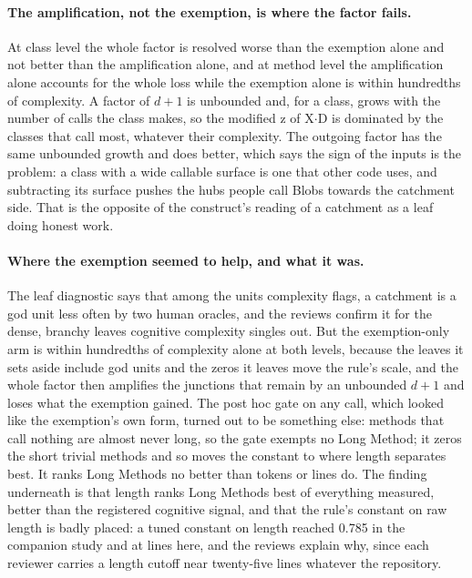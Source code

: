 \documentclass[11pt,a4paper]{article}
\begin{document}
\paragraph{The amplification, not the exemption, is where the factor
fails.} At class level the whole
factor is resolved worse than the exemption alone and not better than the
amplification alone, and at method level the amplification alone accounts
for the whole loss while the exemption alone is within hundredths of
complexity. A factor of $d + 1$ is
unbounded and, for a class, grows with the number of calls the class makes,
so the modified z of X$\cdot$D is dominated by the classes that call most,
whatever their complexity. The outgoing factor has the same unbounded
growth and does better, which says the sign of the inputs is the problem:
a class with a wide callable surface is one that other code uses, and
subtracting its surface pushes the hubs people call Blobs towards the
catchment side. That is the opposite of the construct's reading of a
catchment as a leaf doing honest work.

\paragraph{Where the exemption seemed to help, and what it was.} The leaf
diagnostic says that among the units complexity flags, a catchment is a god
unit less often by two human oracles, and the reviews confirm it for the
dense, branchy leaves cognitive complexity singles out. But the
exemption-only arm is within hundredths of complexity alone at both levels,
because the leaves it sets aside include god units and the zeros it leaves
move the rule's scale, and the whole factor then amplifies the junctions
that remain by an unbounded $d + 1$ and loses what the exemption gained.
The post hoc gate on any call, which looked like the exemption's own form,
turned out to be something else: methods that call nothing are almost never
long, so the gate exempts no Long Method; it zeros the short trivial
methods and so moves the constant to where length separates best. It ranks
Long Methods no better than tokens or lines do. The finding underneath is
that length ranks Long Methods best of everything measured, better than the
registered cognitive signal, and that the rule's constant on raw length is
badly placed: a tuned constant on length reached 0.785 in the companion
study and \lwLengthMccConfirm{} at \lwLengthCutoff{} lines here, and the
reviews explain why, since each reviewer carries a length cutoff near
twenty-five lines whatever the repository.
\end{document}
